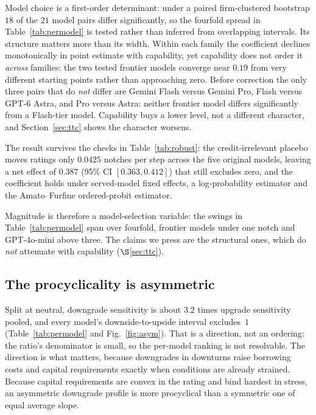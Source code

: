 \documentclass[a4paper,fleqn]{cas-sc}
\begin{document}
Model choice is a first-order determinant: under a paired firm-clustered bootstrap $18$ of the $21$
model pairs differ significantly, so the fourfold spread in Table~\ref{tab:permodel} is tested rather
than inferred from overlapping intervals. Its structure matters more than its width. Within each family
the coefficient declines monotonically in point estimate with capability, yet capability does not order it \emph{across}
families: the two tested frontier models converge near $0.19$ from very different starting points
rather than approaching zero. Before correction the only three pairs that do \emph{not} differ are Gemini Flash versus Gemini Pro,
Flash versus GPT-6 Astra, and Pro versus Astra: neither frontier model differs
significantly from a Flash-tier model. Capability buys a lower level, not a different character,
and Section~\ref{sec:ttc} shows the character worsens.

The result survives the checks in Table~\ref{tab:robust}: the credit-irrelevant placebo moves
ratings only $0.0425$ notches per step across the five original models, leaving a net effect of $0.387$ (95\% CI $[0.363,0.412]$) that
still excludes zero, and the coefficient holds under served-model fixed effects, a log-probability
estimator and the Amato--Furfine ordered-probit estimator.

Magnitude is therefore a model-selection variable: the swings in Table~\ref{tab:permodel} span over
fourfold, frontier models under one notch and GPT-4o-mini above three. The claims we press are the
structural ones, which do \emph{not} attenuate with capability ($\S$\ref{sec:ttc}).

\subsection{The procyclicality is asymmetric}\label{sec:asym}
Split at neutral, downgrade sensitivity is about $3.2$ times upgrade sensitivity pooled, and every
model's downside-to-upside interval excludes~$1$ (Table~\ref{tab:permodel} and Fig.~\ref{fig:asym}). That is a direction, not an
ordering: the ratio's denominator is small, so the per-model ranking is not resolvable. The direction is
what matters, because downgrades in downturns raise borrowing costs and capital requirements exactly
when conditions are already strained. Because capital requirements are convex in the rating and bind hardest in stress,
an asymmetric downgrade profile is more procyclical than a symmetric one of equal average slope.
\end{document}
